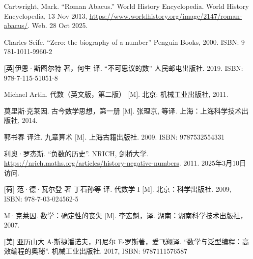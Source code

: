 Cartwright, Mark. ``Roman Abacus.'' World History Encyclopedia. World History Encyclopedia, 13 Nov 2013, \url{https://www.worldhistory.org/image/2147/roman-abacus/}. Web. 28 Oct 2025.

Charles Seife. ``Zero: the biography of a number'' Penguin Books, 2000. ISBN: 9-781-1011-9960-2

[英]伊恩·斯图尔特 著，何生 译. ``不可思议的数'' 人民邮电出版社. 2019. ISBN: 978-7-115-51051-8

Michael Artin. 代数（英文版，第二版） [M]. 北京: 机械工业出版社, 2011. %

莫里斯$\cdot$克莱因. 古今数学思想，第一册 [M]. 张理京, 等译. 上海：上海科学技术出版社, 2014. %

郭书春 译注. 九章算术 [M]. 上海古籍出版社. 2009. ISBN: 9787532554331

利奥·罗杰斯. ``负数的历史''. NRICH, 剑桥大学. \url{https://nrich.maths.org/articles/history-negative-numbers}. 2011. 2025年3月10日访问.


[荷] 范·德·瓦尔登 著 丁石孙等 译. 代数学 I [M]. 北京：科学出版社. 2009, ISBN: 978-7-03-024562-5

M·克莱因. 数学：确定性的丧失 [M]. 李宏魁，译. 湖南：湖南科学技术出版社，2007. %

[美] 亚历山大 A$\cdot$斯捷潘诺夫，丹尼尔 E$\cdot$罗斯著，爱飞翔译. ``数学与泛型编程：高效编程的奥秘''. 机械工业出版社. 2017, ISBN: 9787111576587

